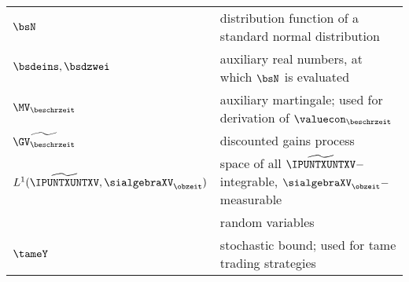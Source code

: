\begin{longtable}{ll}
\\
\hspace{-0.33cm} $\bsN$ & distribution function of a standard normal distribution
\\
\hspace{-0.33cm} $\bsdeins,\bsdzwei$ & auxiliary real numbers, at which $\bsN$ is evaluated
\\
\hspace{-0.33cm} $\MV_{\beschrzeit}$ & auxiliary martingale; used for derivation of 
$\valuecon_{\beschrzeit}$
\\
\hspace{-0.33cm} $\widetilde{\GV_{\beschrzeit}}$ & discounted gains process
\\
\hspace{-0.33cm} $L^{1}({\widetilde{\IPUNTXUNTXV}},
\sialgebraXV_{\obzeit})$ & space of all ${\widetilde{\IPUNTXUNTXV}}-$integrable, $\sialgebraXV_{\obzeit}-$
measurable  
\\
\hspace{-0.33cm} $\ $ & random variables     
\\
\hspace{-0.33cm} $\tameY$ & stochastic bound; used for tame trading strategies
\\

 \end{longtable}


\clearemptydoublepage  %









